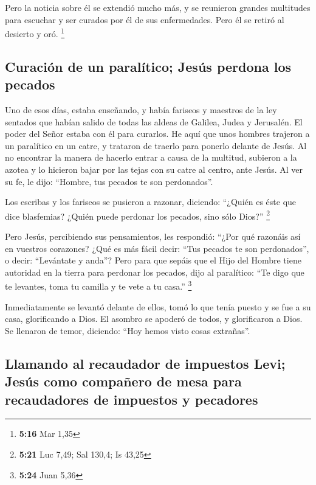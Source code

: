  Pero la noticia sobre él se extendió mucho más, y se
reunieron grandes multitudes para escuchar y ser curados por él de sus
enfermedades.  Pero él se retiró al desierto y oró.
\footnote{\textbf{5:16} Mar 1,35}

\hypertarget{curaciuxf3n-de-un-paraluxedtico-jesuxfas-perdona-los-pecados}{%
\subsection{Curación de un paralítico; Jesús perdona los
pecados}\label{curaciuxf3n-de-un-paraluxedtico-jesuxfas-perdona-los-pecados}}

 Uno de esos días, estaba enseñando, y había fariseos y
maestros de la ley sentados que habían salido de todas las aldeas de
Galilea, Judea y Jerusalén. El poder del Señor estaba con él para
curarlos.  He aquí que unos hombres trajeron a un
paralítico en un catre, y trataron de traerlo para ponerlo delante de
Jesús.  Al no encontrar la manera de hacerlo entrar a
causa de la multitud, subieron a la azotea y lo hicieron bajar por las
tejas con su catre al centro, ante Jesús.  Al ver su fe,
le dijo: ``Hombre, tus pecados te son perdonados''.

 Los escribas y los fariseos se pusieron a razonar,
diciendo: ``¿Quién es éste que dice blasfemias? ¿Quién puede perdonar
los pecados, sino sólo Dios?'' \footnote{\textbf{5:21} Luc 7,49; Sal
  130,4; Is 43,25}

 Pero Jesús, percibiendo sus pensamientos, les respondió:
``¿Por qué razonáis así en vuestros corazones?  ¿Qué es
más fácil decir: ``Tus pecados te son perdonados'', o decir: ``Levántate
y anda''?  Pero para que sepáis que el Hijo del Hombre
tiene autoridad en la tierra para perdonar los pecados, dijo al
paralítico: ``Te digo que te levantes, toma tu camilla y te vete a tu
casa.'' \footnote{\textbf{5:24} Juan 5,36}

 Inmediatamente se levantó delante de ellos, tomó lo que
tenía puesto y se fue a su casa, glorificando a Dios.  El
asombro se apoderó de todos, y glorificaron a Dios. Se llenaron de
temor, diciendo: ``Hoy hemos visto cosas extrañas''.

\hypertarget{llamando-al-recaudador-de-impuestos-levi-jesuxfas-como-compauxf1ero-de-mesa-para-recaudadores-de-impuestos-y-pecadores}{%
\subsection{Llamando al recaudador de impuestos Levi; Jesús como
compañero de mesa para recaudadores de impuestos y
pecadores}\label{llamando-al-recaudador-de-impuestos-levi-jesuxfas-como-compauxf1ero-de-mesa-para-recaudadores-de-impuestos-y-pecadores}}

